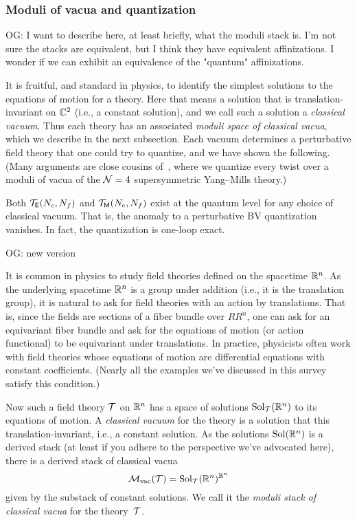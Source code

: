 \documentclass[11pt]{amsart}
\def\Sol{\text{Sol}}
\def\owen#1{{\textcolor{violet!65!black}{OG: {#1}}}}
\begin{document}
\subsubsection{Moduli of vacua and quantization}

\owen{I want to describe here, at least briefly, what the moduli stack is. I'm not sure the stacks are equivalent, but I think they have equivalent affinizations. I wonder if we can exhibit an equivalence of the "quantum" affinizations.}

It is fruitful, and standard in physics, to identify the simplest solutions to the equations of motion for a theory.
Here that means a solution that is translation-invariant on $\mathbb C^2$ (i.e., a constant solution),
and we call such a solution a {\em classical vacuum}.
Thus each theory has an associated {\em moduli space of classical vacua},
which we describe in the next subsection.
Each vacuum determines a perturbative field theory that one could try to quantize,
and we have shown the following.
(Many arguments are close cousins of~\cite{EGW}, where we quantize every twist over a moduli of vacua of the $\mathcal N=4$ supersymmetric Yang--Mills theory.)

\begin{thm}
Both $\mathcal T_{\mathsf E}(N_c, N_f)$ and $\mathcal T_{{\sf M}}(N_c, N_f)$ exist at the quantum level for any choice of classical vacuum. 
That is, the anomaly to a perturbative BV quantization vanishes.
In fact, the quantization is one-loop exact. 
\end{thm}

\owen{new version}

It is common in physics to study field theories defined on the spacetime $\mathbb R^n$.
As the underlying spacetime $\mathbb R^n$ is a group under addition (i.e., it is the translation group),
it is natural to ask for field theories with an action by translations.
That is, since the fields are sections of a fiber bundle over $RR^n$,
one can ask for an equivariant fiber bundle and ask for the equations of motion (or action functional) to be equivariant under translations.
In practice, physicists often work with field theories whose equations of motion are differential equations with constant coefficients.
(Nearly all the examples we've discussed in this survey satisfy this condition.)

Now such a field theory $\mathcal T$ on $\mathbb R^n$ has a space of solutions $\Sol_\cT(\RR^n)$ to its equations of motion.
A {\em classical vacuum} for the theory is a solution that this translation-invariant,
i.e., a constant solution.
As the solutions $\Sol(\RR^n)$ is a derived stack (at least if you adhere to the perspective we've advocated here), there is a derived stack of classical vacua
\[
\cM_{\rm vac}(\cT) = \Sol_\cT(\RR^n)^{\RR^n}
\]
given by the substack of constant solutions.
We call it the {\em moduli stack of classical vacua} for the theory~$\mathcal T$.
\end{document}
